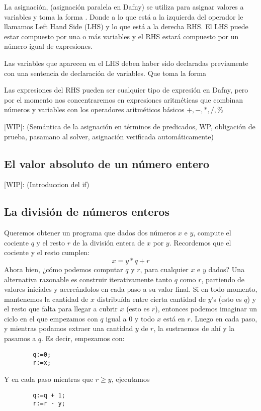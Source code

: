 \documentclass[12pt, a4paper, openany, fleqn]{book}
\begin{document}
    La asignación, (asignación paralela en Dafny) se utiliza para asignar valores a variables y toma la forma . Donde a lo que está a la izquierda del operador \inlinedafny{:=} le llamamos Left Hand Side (LHS) y lo que está a la derecha RHS. El LHS puede estar compuesto por una o más variables y el RHS estará compuesto por un número igual de expresiones.

    Las variables que aparecen en el LHS deben haber sido declaradas previamente con una sentencia de declaración de variables. Que toma la forma 

    Las expresiones del RHS pueden ser cualquier tipo de expresión en Dafny, pero por el momento nos concentraremos en expresiones aritméticas que combinan números y variables con los operadores aritméticos básicos $+,-,*,/,\%$

    [WIP]: (Semántica de la asignación en términos de predicados, WP, obligación de prueba, pasamano al solver, asignación verificada automáticamente)

    \subsection{El valor absoluto de un número entero}
    [WIP]: (Introduccion del if)

    \subsection{La división de números enteros}
    Queremos obtener un programa que dados dos números $x$ e $y$, compute el cociente $q$ y el resto $r$ de la división entera de $x$ por $y$.
    Recordemos que el cociente y el resto cumplen:
    $$x = y * q + r$$
    Ahora bien, ¿cómo podemos computar $q$ y $r$, para cualquier $x$ e $y$ dados?
    Una alternativa razonable es construir iterativamente tanto $q$ como $r$, partiendo de valores iniciales y acercándolos en cada paso a su valor final.
    Si en todo momento, mantenemos la cantidad de $x$ distribuída entre cierta cantidad de $y$’s (esto es $q$) y el resto que falta para llegar a cubrir $x$ (esto es $r$), entonces podemos imaginar un ciclo en el que empezamos con $q$ igual a 0 y todo $x$ está en $r$.
    Luego en cada paso, y mientras podamos extraer una cantidad $y$ de $r$, la sustraemos de ahí y la pasamos a $q$.
    Es decir, empezamos con:
    \begin{verbatim}
        q:=0;
        r:=x;
    \end{verbatim}
    Y en cada paso mientras que $r \geq y$, ejecutamos
    \begin{verbatim}
        q:=q + 1;
        r:=r - y;
    \end{verbatim}
\end{document}
